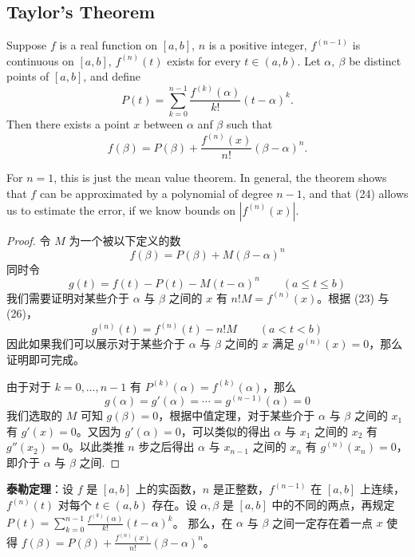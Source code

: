 \documentclass[../poma-notes.tex]{subfiles}
\begin{document}
\subsection*{Taylor's Theorem}

\begin{theorem}
  Suppose $f$ is a real function on $[a, b]$, $n$ is a positive integer, $f^(n-1)$ is continuous on $[a, b]$,
  $f^(n)(t)$ exists for every $t \in (a, b)$. Let $\alpha,\ \beta$ be distinct points of $[a, b]$, and define
  \begin{equation}
    P(t) = \sum_{k=0}^{n-1} \frac{f^(k)(\alpha)}{k!} (t-\alpha)^k.
  \end{equation}
  Then there exists a point $x$ between $\alpha$ anf $\beta$ such that
  \begin{equation}
    f(\beta) = P(\beta) + \frac{f^(n)(x)}{n!} (\beta - \alpha)^n.
  \end{equation}

  For $n = 1$, this is just the mean value theorem. In general, the theorem shows that $f$ can be approximated
  by a polynomial of degree $n-1$, and that (24) allows us to estimate the error, if we know bounds on $|f^(n)(x)|$.
\end{theorem}

\begin{proof}
  令 $M$ 为一个被以下定义的数
  \begin{equation}
    f(\beta) = P(\beta) + M(\beta - \alpha)^n
  \end{equation}
  同时令
  \begin{equation}
    g(t) = f(t) - P(t) - M(t - \alpha)^n \qquad (a\le t \le b)
  \end{equation}
  我们需要证明对某些介于 $\alpha$ 与 $\beta$ 之间的 $x$ 有 $n! M = f^(n)(x)$。根据 (23) 与 (26)，
  \begin{equation}
    g^(n)(t) = f^(n)(t) - n!M \qquad (a<t<b)
  \end{equation}
  因此如果我们可以展示对于某些介于 $\alpha$ 与 $\beta$ 之间的 $x$ 满足 $g^(n)(x) = 0$，那么证明即可完成。

  由于对于 $k = 0,\dots,n-1$ 有 $P^(k)(\alpha) = f^(k)(\alpha)$，那么
  \begin{equation}
    g(\alpha) = g'(\alpha) = \cdots = g^(n-1)(\alpha) = 0
  \end{equation}
  我们选取的 $M$ 可知 $g(\beta) = 0$，根据中值定理，对于某些介于 $\alpha$ 与 $\beta$ 之间的 $x_1$ 有 $g'(x) = 0$。又因为
  $g'(\alpha) = 0$，可以类似的得出 $\alpha$ 与 $x_1$ 之间的 $x_2$ 有 $g''(x_2) = 0$。以此类推 $n$ 步之后得出 $\alpha$ 与
  $x_{n-1}$ 之间的 $x_n$ 有 $g^(n)(x_n) = 0$，即介于 $\alpha$ 与 $\beta$ 之间.
\end{proof}

\begin{anote}
  \textbf{泰勒定理}：设 $f$ 是 $[a,b]$ 上的实函数，$n$ 是正整数，$f^(n-1)$ 在 $[a,b]$ 上连续，$f^(n)(t)$ 对每个 $t\in (a,b)$
  存在。设 $\alpha,\beta$ 是 $[a,b]$ 中的不同的两点，再规定 $P(t)=\sum_{k=0}^{n-1}\frac{f^(k)(\alpha)}{k!}(t-\alpha)^k$。
  那么，在 $\alpha$ 与 $\beta$ 之间一定存在着一点 $x$ 使得 $f(\beta)=P(\beta)+\frac{f^(n)(x)}{n!}(\beta-\alpha)^n$。
\end{anote}
\end{document}
